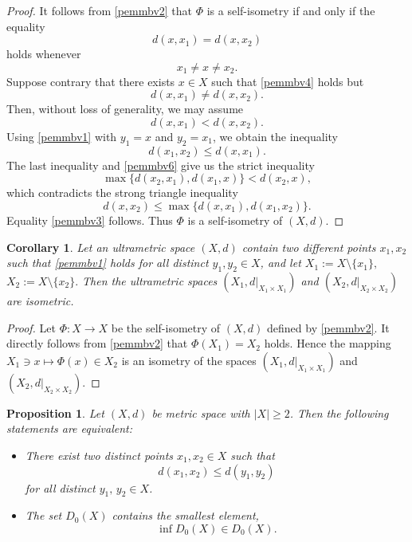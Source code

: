 \documentclass[11pt]{article}
\newtheorem{corollary}[theorem]{Corollary}
\newtheorem{proposition}[theorem]{Proposition}
\theoremstyle{definition}
\theoremstyle{remark}
\numberwithin{equation}{section}
\begin{document}
\begin{proof}
It follows from \eqref{pemmbv2} that $\Phi$ is a self-isometry 
if and only if the equality  
\begin{equation}
    \label{pemmbv3}
d(x,x_1) = d(x,x_2) 
\end{equation}
holds whenever 
\begin{equation}
\label{pemmbv4}
    x_1 \neq x \neq x_2.
\end{equation}
Suppose contrary that there exists $x \in X$ such that \eqref{pemmbv4} holds but  
\[
d(x,x_1) \neq d(x,x_2).
\]
Then, without loss of generality, we may assume
\begin{equation}
\label{pemmbv6}
d(x,x_1) < d(x,x_2). 
\end{equation}
Using \eqref{pemmbv1} with $y_1 = x$ and $y_2 = x_1$, we obtain the inequality
\[
d(x_1,x_2) \leq d(x,x_1).
\]
The last inequality and \eqref{pemmbv6} give us the strict inequality
\[
 \max \{ d(x_2,x_1), d(x_1,x) \}< d(x_2,x),
\]
which contradicts the strong triangle inequality
\[
d(x,x_2) \leq \max \{ d(x,x_1), d(x_1,x_2) \}.
\]
Equality \eqref{pemmbv3} follows.  
Thus $\Phi$ is a self-isometry of $(X,d)$. 

\end{proof}





\begin{corollary}\label{tbhjss}
Let an ultrametric space $(X,d)$ contain two different points $x_1, x_2$ such that \eqref{pemmbv1} holds for all distinct $y_1,y_2 \in X$, and let
$
    X_1 := X \setminus \{x_1\}, $
$
    X_2 := X \setminus \{x_2\}.
$
Then the ultrametric spaces $(X_1, d|_{X_1\times X_1})$ and $(X_2, d|_{X_2\times X_2})$ are isometric.
\end{corollary}

\begin{proof}
Let $\Phi : X \to X$ be the self-isometry of $(X,d)$ defined by \eqref{pemmbv2}.  
It directly follows from \eqref{pemmbv2} that $\Phi(X_1) = X_2$ holds.  
Hence the mapping 
$
    X_1 \ni x \mapsto \Phi(x) \in X_2
$
is an isometry of the spaces $(X_1, d|_{X_1\times X_1})$ and $(X_2, d|_{X_2\times X_2})$.
\end{proof}









\begin{proposition}
    \label{jhfdc}
    Let $(X,d)$ be metric space with $|X| \ge 2$. Then the following statements are equivalent:

\begin{itemize}[left=10pt]
\item[(i)] There exist two distinct points $x_1, x_2 \in X$ such that
\[
d(x_1,x_2) \leq d(y_1,y_2)
\]
for all distinct $y_1,\,y_2\in X$.

\item[(ii)] The set $D_0(X)$ contains the smallest element,
\[
\inf D_0(X) \in D_0(X).
\]
\end{itemize}

\end{proposition}
\end{document}

